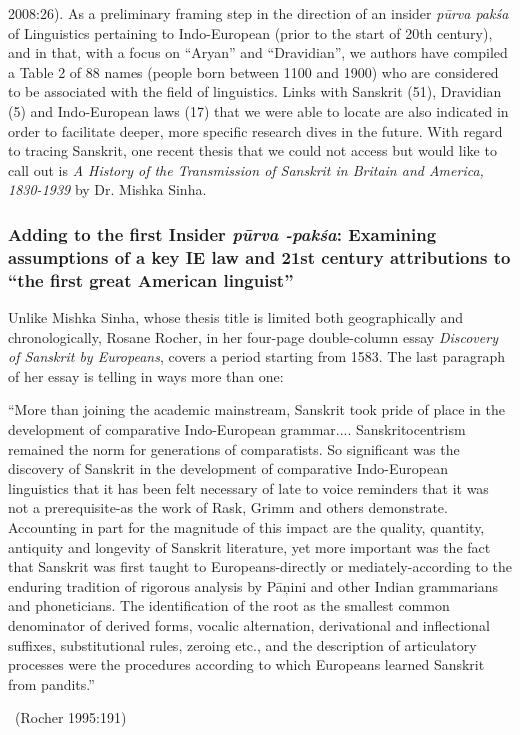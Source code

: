 2008:26). As a preliminary framing step in the direction of an insider \textit{pūrva pakśa} of Linguistics pertaining to Indo-European (prior to the start of 20th century), and in that, with a focus on “Aryan” and “Dravidian”, we authors have compiled a Table 2 of 88 names (people born between 1100 and 1900) who are considered to be associated with the field of linguistics. Links with Sanskrit (51), Dravidian (5) and Indo-European laws (17) that we were able to locate are also indicated in order to facilitate deeper, more specific research dives in the future. With regard to tracing Sanskrit, one recent thesis that we could not access but would like to call out is \textit{A History of the Transmission of Sanskrit in Britain and America, 1830-1939} by Dr. Mishka Sinha.


\subsubsection{Adding to the first Insider \textit{pūrva -pakśa}: Examining assumptions of a key IE law and 21st century attributions to “the first great American linguist”}

Unlike Mishka Sinha, whose thesis title is limited both geographically and chronologically, Rosane Rocher, in her four-page double-column essay \textit{Discovery of Sanskrit by Europeans}, covers a period starting from 1583. The last paragraph of her essay is telling in ways more than one:

\begin{myquote}
“More than joining the academic mainstream, Sanskrit took pride of place in the development of comparative Indo-European grammar.... Sanskritocentrism remained the norm for generations of comparatists. So significant was the discovery of Sanskrit in the development of comparative Indo-European linguistics that it has been felt necessary of late to voice reminders that it was not a prerequisite-as the work of Rask, Grimm and others demonstrate. Accounting in part for the magnitude of this impact are the quality, quantity, antiquity and longevity of Sanskrit literature, yet more important was the fact that Sanskrit was first taught to Europeans-directly or mediately-according to the enduring tradition of rigorous analysis by Pāņini and other Indian grammarians and phoneticians. The identification of the root as the smallest common denominator of derived forms, vocalic alternation, derivational and inflectional suffixes, substitutional rules, zeroing etc., and the description of articulatory processes were the procedures according to which Europeans learned Sanskrit from pandits.”

~\hfill (Rocher 1995:191)
\end{myquote}

